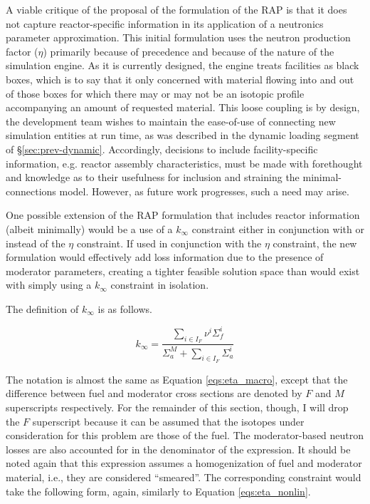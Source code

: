 A viable critique of the proposal of the formulation of the RAP is that it does
not capture reactor-specific information in its application of a neutronics
parameter approximation. This initial formulation uses the neutron production
factor ($\eta$) primarily because of precedence and because of the nature of the
\Cyclus simulation engine. As it is currently designed, the \Cyclus engine
treats facilities as black boxes, which is to say that it only concerned with
material flowing into and out of those boxes for which there may or may not be
an isotopic profile accompanying an amount of requested material. This loose
coupling is by design, the \Cyclus development team wishes to maintain the
ease-of-use of connecting new simulation entities at run time, as was described
in the dynamic loading segment of \S\ref{sec:prev-dynamic}. Accordingly,
decisions to include facility-specific information, e.g. reactor assembly
characteristics, must be made with forethought and knowledge as to their
usefulness for inclusion and straining the minimal-connections model. However,
as future work progresses, such a need may arise.

One possible extension of the RAP formulation that includes reactor information
(albeit minimally) would be a use of a $k_{\infty}$ constraint either in
conjunction with or instead of the $\eta$ constraint. If used in conjunction
with the $\eta$ constraint, the new formulation would effectively add loss
information due to the presence of moderator parameters, creating a tighter
feasible solution space than would exist with simply using a $k_{\infty}$
constraint in isolation. 

The definition of $k_{\infty}$ is as follows.

\begin{equation}\label{eqs:kinf_macro}
k_{\infty} = \frac{\sum_{i \in I_{F}} \nu^{i} \Sigma_{f}^{i}}
                  {\Sigma_{a}^{M} + \sum_{i \in I_{F}} \Sigma_{a}^{i}}
\end{equation}

The notation is almost the same as Equation \ref{eqs:eta_macro}, except that the
difference between fuel and moderator cross sections are denoted by $F$ and $M$
superscripts respectively. For the remainder of this section, though, I will
drop the $F$ superscript because it can be assumed that the isotopes under
consideration for this problem are those of the fuel. The moderator-based
neutron losses are also accounted for in the denominator of the expression. It
should be noted again that this expression assumes a homogenization of fuel and
moderator material, i.e., they are considered ``smeared''. The corresponding
constraint would take the following form, again, similarly to Equation
\ref{eqs:eta_nonlin}.

